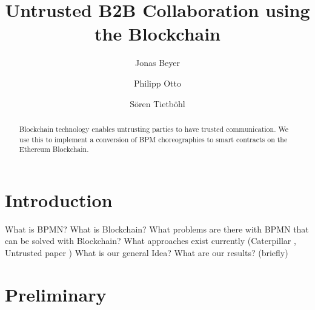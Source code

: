 \documentclass[runningheads]{llncs}
\begin{document}
%
\title{Untrusted B2B Collaboration using the Blockchain}
%
%
\author{Jonas Beyer \and
Philipp Otto\and
S\"oren Tietb\"ohl}
%
%
%
\maketitle              %
%
\begin{abstract}
Blockchain technology enables untrusting parties to have trusted communication. We use this to implement a conversion of BPM choreographies to smart contracts on the Ethereum Blockchain.

\end{abstract}
%
%
%
\section{Introduction}





What is BPMN?
What is Blockchain?
What problems are there with BPMN that can be solved with Blockchain?
What approaches exist currently (Caterpillar \cite{lopez2017caterpillar}, Untrusted paper \cite{weber2016untrusted})
What is our general Idea?
What are our results? (briefly)

\section{Preliminary}
\end{document}
